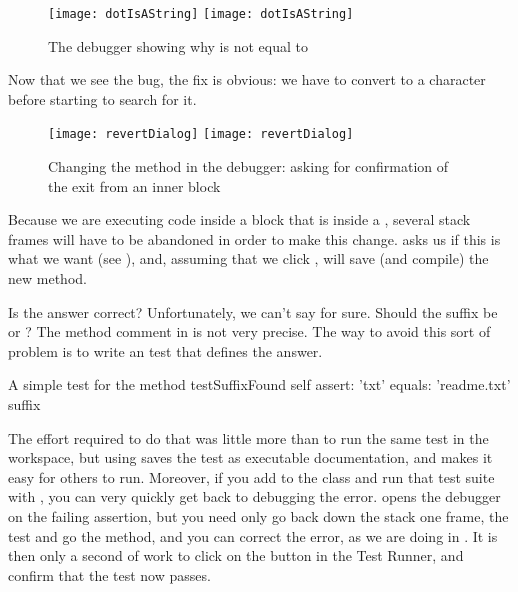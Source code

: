 \documentclass[a4paper,10pt,twoside]{book}
\begin{document}
\begin{figure}[btp]
	\begin{center}
	\ifluluelse
		{\texttt{[image: dotIsAString]}}
		{\texttt{[image: dotIsAString]}}
	\end{center}
	\caption{The debugger showing why  is not equal to }
	\label{fig:dotIsAString}
\end{figure}

Now that we see the bug, the fix is obvious: we have to convert  to a character before starting to search for it.  

\begin{figure}[btp]
	\begin{center}
	\ifluluelse
		{\texttt{[image: revertDialog]}}
		{\texttt{[image: revertDialog]}}
	\end{center}
	\caption{Changing the  method in the debugger: asking for confirmation of the exit from an inner block}
	\label{fig:revertDialog}
\end{figure}

Because we are executing code inside a block that is inside a , several stack frames will have to be abandoned in order to make this change.  \sq asks us if this is what we want (see ), and, assuming that we click , will save (and compile) the new method.


Is the answer correct?  Unfortunately, we can't say for sure.  Should the suffix be  or ?
The method comment in  is not very precise.  
The way to avoid this sort of problem is to write an  test that defines the answer.

\begin{method}[testSuffix]{A simple test for the  method}
testSuffixFound
	self assert: 'txt' equals: 'readme.txt' suffix
\end{method}

The effort required to do that was little more than to run the same test in the workspace, but using \sunit saves the test as executable documentation, and makes it easy for others to run.
Moreover, if you add  to the class  and run that test suite with \sunit, you can very quickly get back to debugging the error.
\sunit opens the debugger on the failing assertion, but you need only go back down the stack one frame,  the test and go  the  method, and you can correct the error, as we are doing in .
It is then only  a second of work to click on the  button in the \sunit Test Runner, and confirm that the test now passes.
\end{document}
